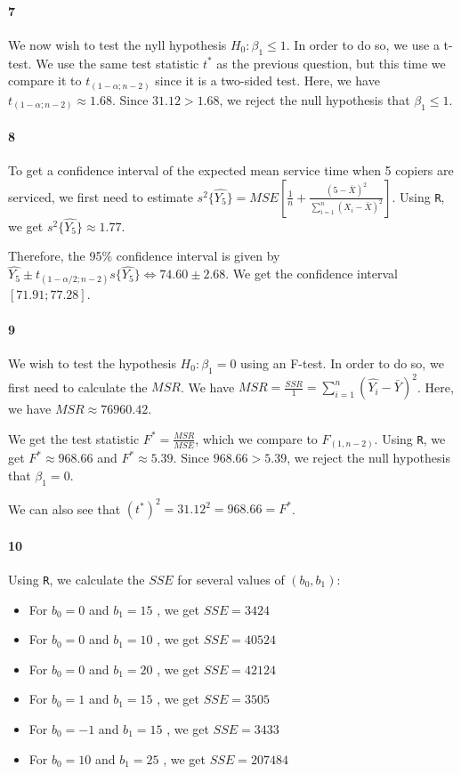 \documentclass[]{article}
\let\oldparagraph\paragraph
\renewcommand{\paragraph}[1]{\oldparagraph{#1}\mbox{}}
\begin{document}
\paragraph{7}
We now wish to test the nyll hypothesis $H_0 : \beta_1 \leq 1$. In order to do so, we use a t-test. We use the same test statistic $t^*$ as the previous question, but this time we compare it to $t_{(1-\alpha; n-2)}$ since it is a two-sided test. Here, we have $t_{(1-\alpha; n-2)} \approx 1.68$. Since $31.12 > 1.68$, we reject the null hypothesis that $\beta_1 \leq 1$.

\paragraph{8}
To get a confidence interval of the expected mean service time when 5 copiers are serviced, we first need to estimate $s^2\{\hat{Y_5}\} = MSE [\frac{1}{n} + \frac{(5 - \bar{X})^2}{\sum_{i=1}^n{(X_i - \bar{X})^2}}]$. Using \texttt{R}, we get $s^2\{\hat{Y_5}\} \approx 1.77$. 

Therefore, the 95\% confidence interval is given by $\hat{Y_5} \pm t_{(1-\alpha/2; n-2)} s\{\hat{Y_5}\} \Leftrightarrow 74.60 \pm 2.68$. We get the confidence interval $[71.91; 77.28]$.

\paragraph{9}
We wish to test the hypothesis $H_0 : \beta_1 = 0$ using an F-test. In order to do so, we first need to calculate the $MSR$. We have $MSR = \frac{SSR}{1} = \sum^n_{i=1}{(\hat{Y_i} - \bar{Y})^2}$. Here, we have $MSR \approx 76960.42$.

We get the test statistic $F^* = \frac{MSR}{MSE}$, which we compare to $F_{(1, n-2)}$. Using \texttt{R}, we get $F^* \approx 968.66$ and $F^* \approx 5.39$. Since $968.66 > 5.39$, we reject the null hypothesis that $\beta_1 = 0$.

We can also see that $(t^*)^2 = 31.12^2 = 968.66 = F^*$.

\paragraph{10}
Using \texttt{R}, we calculate the $SSE$ for several values of $(b_0, b_1)$:

\begin{itemize}
\item For $b_0 = 0$ and $b_1 = 15$ , we get $SSE = 3424$
\item For $b_0 = 0$ and $b_1 = 10$ , we get $SSE = 40524$
\item For $b_0 = 0$ and $b_1 = 20$ , we get $SSE = 42124$
\item For $b_0 = 1$ and $b_1 = 15$ , we get $SSE = 3505$
\item For $b_0 = -1$ and $b_1 = 15$ , we get $SSE = 3433$
\item For $b_0 = 10$ and $b_1 = 25$ , we get $SSE = 207484$
\end{itemize}
\end{document}
